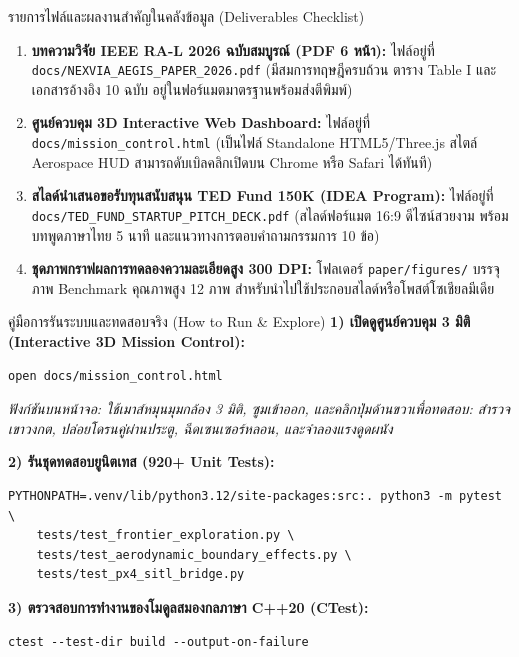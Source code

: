\documentclass[10pt,a4paper]{article}
\begin{document}
\begin{statbox}{รายการไฟล์และผลงานสำคัญในคลังข้อมูล (Deliverables Checklist)}
\begin{enumerate}[leftmargin=18pt, itemsep=4pt]
  \item \textbf{บทความวิจัย IEEE RA-L 2026 ฉบับสมบูรณ์ (PDF 6 หน้า):}  
  ไฟล์อยู่ที่ \texttt{docs/NEXVIA\_AEGIS\_PAPER\_2026.pdf} (มีสมการทฤษฎีครบถ้วน ตาราง Table I และเอกสารอ้างอิง 10 ฉบับ อยู่ในฟอร์แมตมาตรฐานพร้อมส่งตีพิมพ์)
  \item \textbf{ศูนย์ควบคุม 3D Interactive Web Dashboard:}  
  ไฟล์อยู่ที่ \texttt{docs/mission\_control.html} (เป็นไฟล์ Standalone HTML5/Three.js สไตล์ Aerospace HUD สามารถดับเบิลคลิกเปิดบน Chrome หรือ Safari ได้ทันที)
  \item \textbf{สไลด์นำเสนอขอรับทุนสนับสนุน TED Fund 150K (IDEA Program):}  
  ไฟล์อยู่ที่ \texttt{docs/TED\_FUND\_STARTUP\_PITCH\_DECK.pdf} (สไลด์ฟอร์แมต 16:9 ดีไซน์สวยงาม พร้อมบทพูดภาษาไทย 5 นาที และแนวทางการตอบคำถามกรรมการ 10 ข้อ)
  \item \textbf{ชุดภาพกราฟผลการทดลองความละเอียดสูง 300 DPI:}  
  โฟลเดอร์ \texttt{paper/figures/} บรรจุภาพ Benchmark คุณภาพสูง 12 ภาพ สำหรับนำไปใช้ประกอบสไลด์หรือโพสต์โซเชียลมีเดีย
\end{enumerate}
\end{statbox}

\vspace{6pt}

\begin{infobox}[secondary]{คู่มือการรันระบบและทดสอบจริง (How to Run \& Explore)}
\textbf{1) เปิดดูศูนย์ควบคุม 3 มิติ (Interactive 3D Mission Control):}
\begin{verbatim}
open docs/mission_control.html
\end{verbatim}
\textit{ฟังก์ชันบนหน้าจอ: ใช้เมาส์หมุนมุมกล้อง 3 มิติ, ซูมเข้าออก, และคลิกปุ่มด้านขวาเพื่อทดสอบ: สำรวจเขาวงกต, ปล่อยโดรนคู่ผ่านประตู, ฉีดเซนเซอร์หลอน, และจำลองแรงดูดผนัง}

\vspace{4pt}
\textbf{2) รันชุดทดสอบยูนิตเทส (920+ Unit Tests):}
\begin{verbatim}
PYTHONPATH=.venv/lib/python3.12/site-packages:src:. python3 -m pytest \
    tests/test_frontier_exploration.py \
    tests/test_aerodynamic_boundary_effects.py \
    tests/test_px4_sitl_bridge.py
\end{verbatim}

\vspace{4pt}
\textbf{3) ตรวจสอบการทำงานของโมดูลสมองกลภาษา C++20 (CTest):}
\begin{verbatim}
ctest --test-dir build --output-on-failure
\end{verbatim}
\end{infobox}
\end{document}
